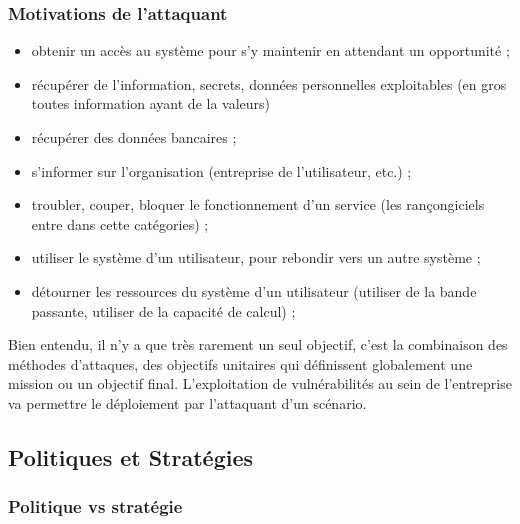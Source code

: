 \begin{frame}
\frametitle<presentation>{Motivations de l'attaquant}

\begin{itemize}
\item obtenir un accès au système pour s’y maintenir en attendant un opportunité ;
\item récupérer de l’information, secrets, données personnelles exploitables (en gros toutes information ayant de la valeurs)
\item récupérer des données bancaires ;
\item s'informer sur l'organisation (entreprise de l'utilisateur, etc.) ;
\item troubler, couper, bloquer le fonctionnement d'un service (les rançongiciels entre dans cette catégories) ;
\item utiliser le système d’un utilisateur, pour rebondir vers un autre système ;
\item détourner les ressources du système d’un utilisateur (utiliser de la bande passante, utiliser de la capacité de calcul) ;
\end{itemize}
\end{frame}

Bien entendu, il n’y a que très rarement un seul objectif, c’est la combinaison des méthodes d’attaques, des objectifs unitaires qui définissent globalement une mission ou un objectif final. L’exploitation de vulnérabilités au sein de l’entreprise va permettre le déploiement par l’attaquant d’un scénario.

\subsection{Politiques et Stratégies}

\begin{frame}
\frametitle<presentation>{Politique vs stratégie}


\end{frame}

